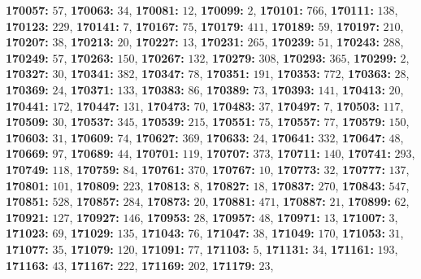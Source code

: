 \textsf{\bfseries 170057:} $57$, \textsf{\bfseries 170063:} $34$, \textsf{\bfseries 170081:} $12$, \textsf{\bfseries 170099:} $2$, \textsf{\bfseries 170101:} $766$, \textsf{\bfseries 170111:} $138$, \textsf{\bfseries 170123:} $229$, \textsf{\bfseries 170141:} $7$, \textsf{\bfseries 170167:} $75$, \textsf{\bfseries 170179:} $411$, \textsf{\bfseries 170189:} $59$, \textsf{\bfseries 170197:} $210$, \textsf{\bfseries 170207:} $38$, \textsf{\bfseries 170213:} $20$, \textsf{\bfseries 170227:} $13$, \textsf{\bfseries 170231:} $265$, \textsf{\bfseries 170239:} $51$, \textsf{\bfseries 170243:} $288$, \textsf{\bfseries 170249:} $57$, \textsf{\bfseries 170263:} $150$, \textsf{\bfseries 170267:} $132$, \textsf{\bfseries 170279:} $308$, \textsf{\bfseries 170293:} $365$, \textsf{\bfseries 170299:} $2$, \textsf{\bfseries 170327:} $30$, \textsf{\bfseries 170341:} $382$, \textsf{\bfseries 170347:} $78$, \textsf{\bfseries 170351:} $191$, \textsf{\bfseries 170353:} $772$, \textsf{\bfseries 170363:} $28$, \textsf{\bfseries 170369:} $24$, \textsf{\bfseries 170371:} $133$, \textsf{\bfseries 170383:} $86$, \textsf{\bfseries 170389:} $73$, \textsf{\bfseries 170393:} $141$, \textsf{\bfseries 170413:} $20$, \textsf{\bfseries 170441:} $172$, \textsf{\bfseries 170447:} $131$, \textsf{\bfseries 170473:} $70$, \textsf{\bfseries 170483:} $37$, \textsf{\bfseries 170497:} $7$, \textsf{\bfseries 170503:} $117$, \textsf{\bfseries 170509:} $30$, \textsf{\bfseries 170537:} $345$, \textsf{\bfseries 170539:} $215$, \textsf{\bfseries 170551:} $75$, \textsf{\bfseries 170557:} $77$, \textsf{\bfseries 170579:} $150$, \textsf{\bfseries 170603:} $31$, \textsf{\bfseries 170609:} $74$, \textsf{\bfseries 170627:} $369$, \textsf{\bfseries 170633:} $24$, \textsf{\bfseries 170641:} $332$, \textsf{\bfseries 170647:} $48$, \textsf{\bfseries 170669:} $97$, \textsf{\bfseries 170689:} $44$, \textsf{\bfseries 170701:} $119$, \textsf{\bfseries 170707:} $373$, \textsf{\bfseries 170711:} $140$, \textsf{\bfseries 170741:} $293$, \textsf{\bfseries 170749:} $118$, \textsf{\bfseries 170759:} $84$, \textsf{\bfseries 170761:} $370$, \textsf{\bfseries 170767:} $10$, \textsf{\bfseries 170773:} $32$, \textsf{\bfseries 170777:} $137$, \textsf{\bfseries 170801:} $101$, \textsf{\bfseries 170809:} $223$, \textsf{\bfseries 170813:} $8$, \textsf{\bfseries 170827:} $18$, \textsf{\bfseries 170837:} $270$, \textsf{\bfseries 170843:} $547$, \textsf{\bfseries 170851:} $528$, \textsf{\bfseries 170857:} $284$, \textsf{\bfseries 170873:} $20$, \textsf{\bfseries 170881:} $471$, \textsf{\bfseries 170887:} $21$, \textsf{\bfseries 170899:} $62$, \textsf{\bfseries 170921:} $127$, \textsf{\bfseries 170927:} $146$, \textsf{\bfseries 170953:} $28$, \textsf{\bfseries 170957:} $48$, \textsf{\bfseries 170971:} $13$, \textsf{\bfseries 171007:} $3$, \textsf{\bfseries 171023:} $69$, \textsf{\bfseries 171029:} $135$, \textsf{\bfseries 171043:} $76$, \textsf{\bfseries 171047:} $38$, \textsf{\bfseries 171049:} $170$, \textsf{\bfseries 171053:} $31$, \textsf{\bfseries 171077:} $35$, \textsf{\bfseries 171079:} $120$, \textsf{\bfseries 171091:} $77$, \textsf{\bfseries 171103:} $5$, \textsf{\bfseries 171131:} $34$, \textsf{\bfseries 171161:} $193$, \textsf{\bfseries 171163:} $43$, \textsf{\bfseries 171167:} $222$, \textsf{\bfseries 171169:} $202$, \textsf{\bfseries 171179:} $23$, 
